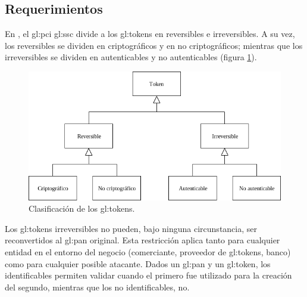 %
%

\subsection{Requerimientos}
\label{sec:requerimientos}

En \cite{pci_tokens}, el \gls{gl:pci} \gls{gl:ssc} divide a los
\glspl{gl:token} en reversibles e irreversibles. A su vez, los reversibles se
dividen en criptográficos y en no criptográficos; mientras que los
irreversibles se dividen en autenticables y no autenticables (figura
\ref{fig:division_tokens}).

\begin{figure}[H]
  \begin{center}
    \includegraphics[width=0.75\linewidth]{diagramas/clasificacion.png}
    \caption{Clasificación de los \glspl{gl:token}.}
    \label{fig:division_tokens}
  \end{center}
\end{figure}

Los \glspl{gl:token} irreversibles no pueden, bajo ninguna circunstancia, ser
reconvertidos al \gls{gl:pan} original. Esta restricción aplica tanto para
cualquier entidad en el entorno del negocio (comerciante, proveedor de
\glspl{gl:token}, banco) como para cualquier posible atacante. Dados un
\gls{gl:pan} y un \gls{gl:token}, los identificables permiten validar cuando el
primero fue utilizado para la creación del segundo, mientras que los no
identificables, no.



